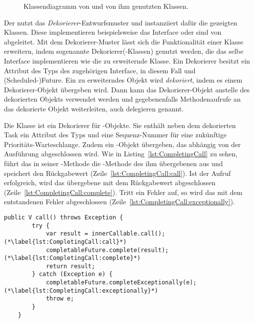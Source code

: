 \begin{figure}[htbp]
	\centering
	
	\caption{Klassendiagramm von \classCompletableFutureWrapper{} und von ihm genutzten Klassen.}\label{fig:wrapper}
\end{figure}

Der \classCompletableFutureWrapper{} nutzt das \emph{Dekorierer}-Entwurfsmuster  und instanziiert dafür die gezeigten Klassen. Diese implementieren beispielsweise das Interface \classCallable{} oder sind von \classCompletableFuture{} abgeleitet. Mit dem Dekorierer-Muster lässt sich die Funktionalität einer Klasse erweitern, indem sogenannte Dekorierer(-Klassen) genutzt werden, die das selbe Interface implementieren wie die zu erweiternde Klasse. Ein Dekorierer besitzt ein Attribut des Typs des zugehörigen Interface, in diesem Fall \classCallable{} und \class(Scheduled-)Future{}. Ein zu erweiterndes Objekt wird \emph{dekoriert}, indem es einem Dekorierer-Objekt übergeben wird. Dann kann das Dekorierer-Objekt anstelle des dekorierten Objekts verwendet werden und gegebenenfalls Methodenaufrufe an das dekorierte Objekt weiterleiten, auch delegieren genannt.


Die Klasse \classCompletingCallable{} ist ein Dekorierer für \classCallable{}-Objekte. Sie enthält neben dem dekorierten Task  ein Attribut des Typs \classTaskPriority{} und eine Sequenz-Nummer für eine zukünftige Prioritäts-Warteschlange. Zudem ein \classCompletableFuture{}-Objekt übergeben, das abhängig von der Ausführung abgeschlossen wird. Wie in Listing~\ref{lst:CompletingCall} zu sehen, führt das \classCompletingCallable{} in seiner -Methode die -Methode des ihm übergebenen \classCallable{}  aus und speichert den Rückgabewert (Zeile~\ref{lst:CompletingCall:call}). Ist der Aufruf erfolgreich, wird das übergebene \classCompletableFuture{} mit dem Rückgabewert abgeschlossen (Zeile~\ref{lst:CompletingCall:complete}). Tritt ein Fehler auf, so wird das  \classCompletableFuture{} mit dem entstandenen Fehler abgeschlossen (Zeile~\ref{lst:CompletingCall:exceptionally}).

\begin{lstlisting}[caption={\code{call()}-Methode von \classCompletingCallable{}. Das enthaltene \classCallable{} wird ausgeführt und dann das \classCompletableFuture{} abgeschlossen.}, label={lst:CompletingCall},float={thbp}]
	public V call() throws Exception {
		try {
			var result = innerCallable.call(); (*\label{lst:CompletingCall:call}*)
			completableFuture.complete(result); (*\label{lst:CompletingCall:complete}*)
			return result;
		} catch (Exception e) {
			completableFuture.completeExceptionally(e); (*\label{lst:CompletingCall:exceptionally}*)
			throw e;
		}
	}
\end{lstlisting}


